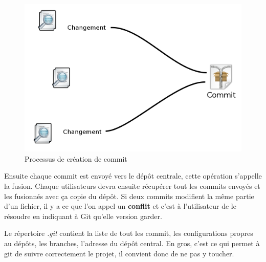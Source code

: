 \documentclass[a4paper]{article}
\begin{document}
\begin{figure}[h]
\centering
\label{figure_commit}
\includegraphics[scale=0.25]{commit.png}
\caption{Processus de création de commit}
\end{figure}

Ensuite chaque commit est envoyé vers le dépôt centrale, cette opération s'appelle la fusion. Chaque utilisateurs devra ensuite récupérer tout les commits envoyés et les fusionnés avec ça copie du dépôt. Si deux commits modifient la même partie d'un fichier, il y a ce que l'on appel un \textbf{conflit} et c'est à l'utilisateur de le résoudre en indiquant à Git qu'elle version garder.

Le répertoire \emph{.git} contient la liste de tout les commit, les configurations propres au dépôts, les branches, l'adresse du dépôt central. En gros, c'est ce qui permet à git de suivre correctement le projet, il convient donc de ne pas y toucher.
\end{document}
